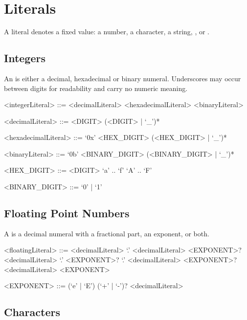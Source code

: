 \documentclass[makeidx]{article}
\begin{document}
\section{Literals}

\LMHash{}%
A literal denotes a fixed value: a number, a character, a string,
\TRUE{}, \FALSE{} or \NULL{}.

\subsection{Integers}

\LMHash{}%
An  is either a decimal,
hexadecimal or binary numeral.
Underscores may occur between digits for readability
and carry no numeric meaning.

\begin{grammar}
<integerLiteral> ::= <decimalLiteral>
  \alt <hexadecimalLiteral>
  \alt <binaryLiteral>

<decimalLiteral> ::= <DIGIT> (<DIGIT> | `_')*

<hexadecimalLiteral> ::= `0x' <HEX\_DIGIT> (<HEX\_DIGIT> | `_')*

<binaryLiteral> ::= `0b' <BINARY\_DIGIT> (<BINARY\_DIGIT> | `_')*

<HEX\_DIGIT> ::= <DIGIT>
  \alt `a' .. `f'
  \alt `A' .. `F'

<BINARY\_DIGIT> ::= `0' | `1'
\end{grammar}

\subsection{Floating Point Numbers}

\LMHash{}%
A  is a decimal numeral
with a fractional part, an exponent, or both.

\begin{grammar}
<floatingLiteral> ::= <decimalLiteral> `.' <decimalLiteral> <EXPONENT>?
  \alt <decimalLiteral> `.' <EXPONENT>?
  \alt `.' <decimalLiteral> <EXPONENT>?
  \alt <decimalLiteral> <EXPONENT>

<EXPONENT> ::= (`e' | `E') (`+' | `-')? <decimalLiteral>
\end{grammar}

\subsection{Characters}
\end{document}
